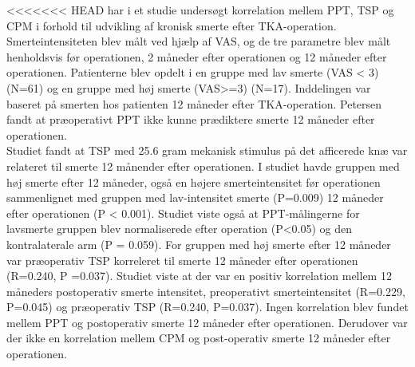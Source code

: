 <<<<<<< HEAD
 har i et studie undersøgt korrelation mellem PPT, TSP og CPM i forhold til udvikling af kronisk smerte efter TKA-operation. Smerteintensiteten blev målt ved hjælp af VAS, og de tre parametre blev målt henholdsvis før operationen, 2 måneder efter operationen og 12 måneder efter operationen. Patienterne blev opdelt i en gruppe med lav smerte (VAS < 3) (N=61) og en gruppe med høj smerte (VAS>=3) (N=17). Inddelingen var baseret på smerten hos patienten 12 måneder efter TKA-operation. Petersen fandt at præoperativt PPT ikke kunne prædiktere smerte 12 måneder efter operationen. \\ %
Studiet fandt at TSP med 25.6 gram mekanisk stimulus på det afficerede knæ var relateret til smerte 12 månender efter operationen. I studiet havde gruppen med høj smerte efter 12 måneder, også en højere smerteintensitet før operationen sammenlignet med gruppen med lav-intensitet smerte (P=0.009) 12 måneder efter operationen (P < 0.001). Studiet viste også at PPT-målingerne for lavsmerte gruppen blev normaliserede efter operation (P<0.05) og den kontralaterale arm (P = 0.059). For gruppen med høj smerte efter 12 måneder var præoperativ TSP korreleret til smerte 12 måneder efter operationen (R=0.240, P =0.037).
Studiet viste at der var en positiv korrelation mellem 12 måneders postoperativ smerte intensitet, preoperativt smerteintensitet (R=0.229, P=0.045) og præoperativ TSP (R=0.240, P=0.037). Ingen korrelation blev fundet mellem PPT og postoperativ smerte 12 måneder efter operationen. Derudover var der ikke en korrelation mellem CPM og post-operativ smerte 12 måneder efter operationen. \citep{Petersen2015}


